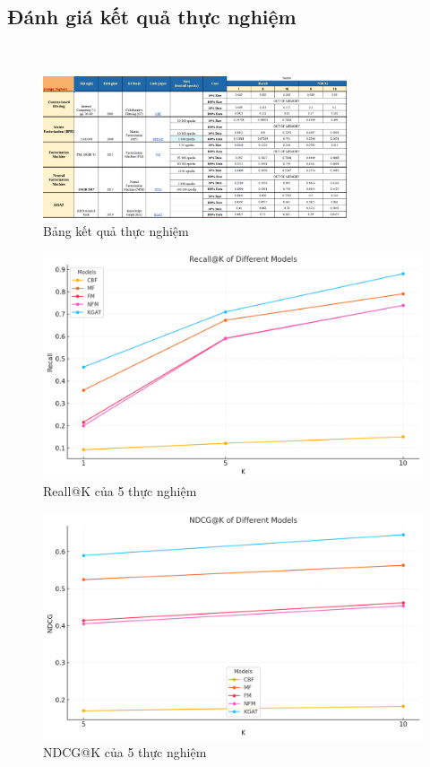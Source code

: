 \subsection{Đánh giá kết quả thực nghiệm}
\textbf{}\\
\label{sec:ketqua}
\begin{figure}[h]
    \centering
    \includegraphics[width=0.8\textwidth]{figures/71.png}
    \caption{Bảng kết quả thực nghiệm}
\end{figure}
\begin{figure}
    \centering
    \includegraphics[width=1\linewidth]{figures/recall.png}
    \caption{Reall@K của 5 thực nghiệm}
\end{figure}
\begin{figure}
    \centering
    \includegraphics[width=1\linewidth]{figures/ndcg.png}
    \caption{NDCG@K của 5 thực nghiệm}
\end{figure}
